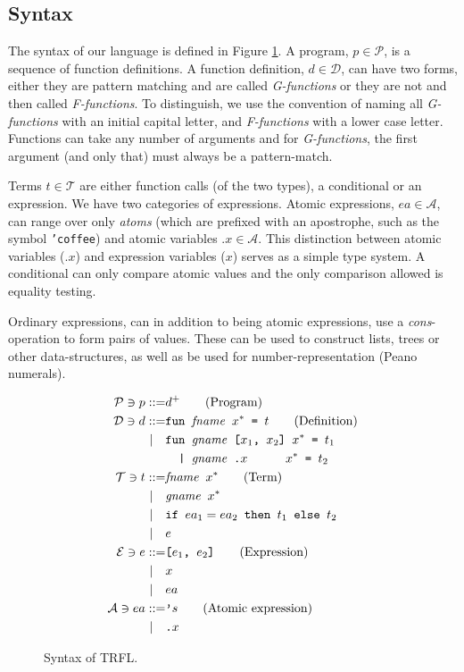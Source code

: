 \documentclass[10pt]{../sigplanconf}
\begin{document}
\subsection{Syntax}
The syntax of our language is defined in Figure \ref{fig:bnf}. A
program, $p \in \mathcal{P}$, is a sequence of function definitions. A
function definition, $d \in \mathcal{D}$, can have two forms, either
they are pattern matching and are called \textit{G-functions} or they
are not and then called \textit{F-functions}. To distinguish, we use
the convention of naming all \textit{G-functions} with an initial
capital letter, and \textit{F-functions} with a lower case
letter. Functions can take any number of arguments and for
\textit{G-functions}, the first argument (and only that) must always
be a pattern-match.

Terms $t \in \mathcal{T}$ are either function calls (of the two
types), a conditional or an expression. We have two categories of
expressions. Atomic expressions, $ea \in \mathcal{A}$, can range over
only \textit{atoms} (which are prefixed with an apostrophe, such as
the symbol \texttt{'coffee}) and atomic variables $\texttt{.}x \in
\mathcal{A}$. This distinction between atomic variables
($\texttt{.}x$) and expression variables ($x$) serves as a simple type
system. A conditional can only compare atomic values and the only
comparison allowed is equality testing.

Ordinary expressions, can in addition to being atomic expressions, use
a \textit{cons}-operation to form pairs of values. These can be used
to construct lists, trees or other data-structures, as well as be used
for number-representation (Peano numerals).

\begin{figure}\centering
  \begin{align*}
    \mathcal{P} \ni p ::= & d^{+}\tag{Program}\\
    \mathcal{D} \ni d ::= &\texttt{fun \textit{\rmfamily fname} $x^{*}$ = $t$}  \tag{Definition} \\
    | \quad &\texttt{fun \textit{\rmfamily gname} [$x_1$, $x_2$] $x^{*}$ = $t_1$} \\
    & \texttt{\ \ | \textit{\rmfamily gname}\ \texttt{.}$x$ \hspace{.7cm} $x^{*}$ = $t_2$}\\
    \mathcal{T} \ni t ::= & \texttt{\textit{\rmfamily fname} $x^{*}$}  \tag{Term}\\
    | \quad & \texttt{\textit{\rmfamily gname} $x^{*}$} \\
    | \quad & \texttt{if $ea_1 = ea_2$ then $t_1$ else $t_2$} \\
    | \quad & e \\
    \mathcal{E} \ni e ::= & \texttt{[$e_1$, $e_2$]} \tag{Expression}\\
    | \quad & x \\
    | \quad & ea \\
    \mathcal{A} \ni ea ::= & \texttt{'}s \tag{Atomic expression}\\
    | \quad & \texttt{.}x
  \end{align*}
  \caption{Syntax of TRFL.}
\label{fig:bnf}
\end{figure}
\end{document}
